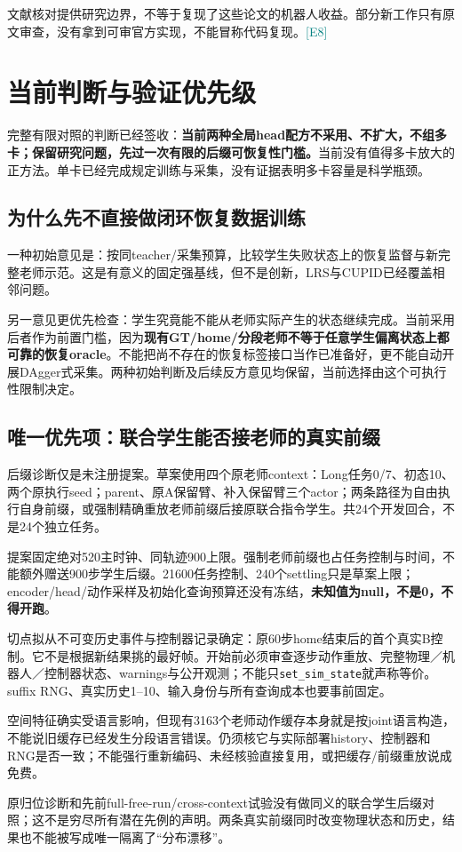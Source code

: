 \documentclass[UTF8,a4paper,fontset=none,zihao=-4]{ctexart}
\newcommand{\ev}[1]{\textcolor{teal}{\small[#1]}}
\begin{document}
文献核对提供研究边界，不等于复现了这些论文的机器人收益。部分新工作只有原文审查，没有拿到可审官方实现，不能冒称代码复现。\ev{E8}
\section{当前判断与验证优先级}
完整有限对照的判断已经签收：\textbf{当前两种全局head配方不采用、不扩大，不组多卡；保留研究问题，先过一次有限的后缀可恢复性门槛。}当前没有值得多卡放大的正方法。单卡已经完成规定训练与采集，没有证据表明多卡容量是科学瓶颈。
\subsection{为什么先不直接做闭环恢复数据训练}
一种初始意见是：按同teacher/采集预算，比较学生失败状态上的恢复监督与新完整老师示范。这是有意义的固定强基线，但不是创新，LRS与CUPID已经覆盖相邻问题。

另一意见更优先检查：学生究竟能不能从老师实际产生的状态继续完成。当前采用后者作为前置门槛，因为\textbf{现有GT/home/分段老师不等于任意学生偏离状态上都可靠的恢复oracle}。不能把尚不存在的恢复标签接口当作已准备好，更不能自动开展DAgger式采集。两种初始判断及后续反方意见均保留，当前选择由这个可执行性限制决定。
\subsection{唯一优先项：联合学生能否接老师的真实前缀}
后缀诊断仅是未注册提案。草案使用四个原老师context：Long任务0/7、初态10、两个原执行seed；parent、原A保留臂、补入保留臂三个actor；两条路径为自由执行自身前缀，或强制精确重放老师前缀后接原联合指令学生。共24个开发回合，不是24个独立任务。

提案固定绝对520主时钟、同轨迹900上限。强制老师前缀也占任务控制与时间，不能额外赠送900步学生后缀。21600任务控制、240个settling只是草案上限；encoder/head/动作采样及初始化查询预算还没有冻结，\textbf{未知值为null，不是0，不得开跑}。

切点拟从不可变历史事件与控制器记录确定：原60步home结束后的首个真实B控制。它不是根据新结果挑的最好帧。开始前必须审查逐步动作重放、完整物理／机器人／控制器状态、warnings与公开观测；不能只\texttt{set\_sim\_state}就声称等价。suffix RNG、真实历史1--10、输入身份与所有查询成本也要事前固定。

空间特征确实受语言影响，但现有3163个老师动作缓存本身就是按joint语言构造，不能说旧缓存已经发生分段语言错误。仍须核它与实际部署history、控制器和RNG是否一致；不能强行重新编码、未经核验直接复用，或把缓存/前缀重放说成免费。

原归位诊断和先前full-free-run/cross-context试验没有做同义的联合学生后缀对照；这不是穷尽所有潜在先例的声明。两条真实前缀同时改变物理状态和历史，结果也不能被写成唯一隔离了“分布漂移”。
\end{document}

